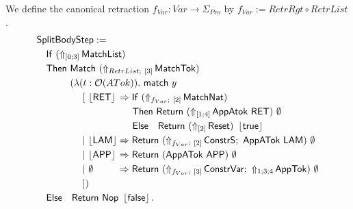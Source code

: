 \begin{definition}[$\MS{SplitBody}$]
  \label{def:JumpTarget}
  We define the canonical retraction $f_{Var} : Var \to \Sigma_{Pro}$ by $f_{Var} := RetrRgt \circ RetrList$.
  \begin{alignat*}{1}
    & \MS{SplitBodyStep} := \\
    & \quad \MS{If}~(\LiftTapes{\MS{MatchList}}{\Vector{0;3}}) \\
    & \quad \MS{Then}~\Match~(\LiftBoth{\MS{MatchTok}}{RetrList}{\Vector{3}}) \\
    & \quad \phantom{\MS{Then}}~(\lambda (t : \Option(ATok)).~\MS{match}~y\\
    & \quad \phantom{\MS{Then}~(\lambda}~[~ \phalign{\Some{\MS{LAM}}}{\Some{\MS{RET}}} \Rightarrow \MS{If}~(\LiftBoth{\MS{MatchNat}}{f_{Var}}{\Vector{2}}) \\
    & \quad \phantom{\MS{Then}~(\lambda~[~ \Some{\MS{LAM} \Rightarrow}}~\MS{Then}~ \Return{(\LiftTapes{\MS{AppAtok~\MS{RET}}}{\Vector{1;4}})}{\None} \\
    & \quad \phantom{\MS{Then}~(\lambda~[~ \Some{\MS{LAM} \Rightarrow}}~\MS{Else}~~~ \Return{(\LiftTapes{\MS{Reset}}{\Vector{2}})}{\Some\true} \\
    & \quad \phantom{\MS{Then}~(\lambda}~|~ \phalign{\Some{\MS{LAM}}}{\Some{\MS{LAM}}} \Rightarrow \Return{(\LiftBoth{\MS{ConstrS}}{f_{Var}}{\Vector{2}} \Seq \MS{AppATok}~\MS{LAM})}{\None} \\
    & \quad \phantom{\MS{Then}~(\lambda}~|~ \phalign{\Some{\MS{LAM}}}{\Some{\MS{APP}}} \Rightarrow \Return{(\MS{AppATok}~\MS{APP})}{\None} \\
    & \quad \phantom{\MS{Then}~(\lambda}~|~ \phalign{\Some{\MS{LAM}}}{\None} \Rightarrow \Return{(\LiftBoth{\MS{ConstrVar}}{f_{Var}}{\Vector{3}} \Seq \LiftTapes{\MS{AppTok}}{1;3;4})}{\None} \\
    & \quad \phantom{\MS{Then}~(\lambda}~]) \\
    & \quad \MS{Else}~~~ \Return{\Nop}{\Some\false}.
  \end{alignat*}

\end{definition}
